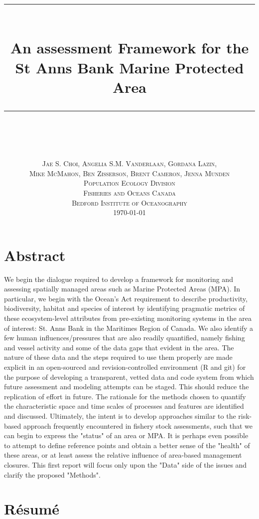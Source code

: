\documentclass[letterpaper,portrait,11pt]{scrartcl}
\title{
    \usefont{OT1}{bch}{b}{n}
    \rule{\linewidth}{0.5pt} \\[0.4cm]
    \huge An assessment Framework for the St Anns Bank Marine Protected Area  \\
    \rule{\linewidth}{2pt} \\[1.0cm]
}
\author{
    \normalfont \normalsize  \textsc{Jae S. Choi, Angelia S.M. Vanderlaan, Gordana Lazin,} \\
    \normalfont \normalsize  \textsc{Mike McMahon,  Ben Zisserson, Brent Cameron, Jenna Munden} \\ [25pt]
    \normalfont \normalsize \textsc{Population Ecology Division} \\
    \normalfont \normalsize \textsc{Fisheries and Oceans Canada} \\
    \normalfont \normalsize \textsc{Bedford Institute of Oceanography} \\ [25pt]
    \normalsize \textsc{\today}
}
\numberwithin{equation}{section}    %
\numberwithin{figure}{section}    %
\numberwithin{table}{section}       %
\begin{document}
\setcounter{page}{3}

\section*{Abstract}

We begin the dialogue required to develop a framework for monitoring and assessing spatially managed areas such as Marine Protected Areas (MPA). In particular, we begin with the Ocean's Act requirement to describe productivity, biodiversity, habitat and species of interest by identifying pragmatic metrics of these ecosystem-level attributes from pre-existing monitoring systems in the area of interest: St. Anns Bank in the Maritimes Region of Canada. We also identify a few human influences/pressures that are also readily quantified, namely fishing and vessel activity and some of the data gaps that evident in the area. The nature of these data and the steps required to use them properly are made explicit in an open-sourced and revision-controlled environment (R and git) for the purpose of developing a transparent, vetted data and code system from which future assessment and modeling attempts can be staged. This should reduce the replication of effort in future. The rationale for the methods chosen to quantify the characteristic space and time scales of processes and features are identified and discussed. Ultimately, the intent is to develop approaches similar to the risk-based approach frequently encountered in fishery stock assessments, such that we can begin to express the "status" of an area or MPA. It is perhaps even possible to attempt to define reference points and obtain a better sense of the "health" of these areas, or at least assess the relative influence of area-based management closures. This first report will focus only upon the "Data" side of the issues and clarify the proposed "Methods".


\newpage
\section*{R\'{e}sum\'{e}}
\end{document}
